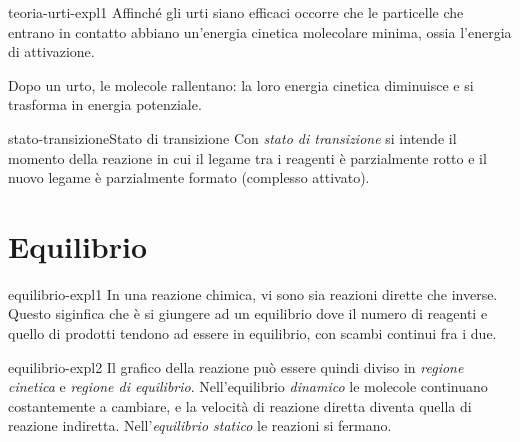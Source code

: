 \documentclass[preview]{standalone}
\begin{document}

\begin{snippet}{teoria-urti-expl1}
    Affinché gli urti siano efficaci occorre che le particelle che
    entrano in contatto abbiano un'energia cinetica molecolare
    minima, ossia l'energia di attivazione.

    Dopo un urto, le molecole rallentano: la loro energia
    cinetica diminuisce e si trasforma in energia potenziale.
\end{snippet}

\begin{snippetdefinition}{stato-transizione}{Stato di transizione}
    Con \textit{stato di transizione} si intende
    il momento della reazione in cui il
    legame tra i reagenti è parzialmente rotto e il nuovo
    legame è parzialmente formato (complesso attivato).
\end{snippetdefinition}



\section{Equilibrio}

\begin{snippet}{equilibrio-expl1}
    In una reazione chimica, vi sono sia reazioni dirette che inverse.
    Questo siginfica che è si giungere ad un equilibrio dove
    il numero di reagenti e quello di prodotti tendono ad essere in equilibrio,
    con scambi continui fra i due.
\end{snippet}


\begin{snippet}{equilibrio-expl2}
    Il grafico della reazione può essere quindi diviso in \textit{regione cinetica}
    e \textit{regione di equilibrio}. 
    Nell'equilibrio \textit{dinamico} le molecole continuano costantemente a
    cambiare, e la velocità di reazione diretta diventa quella di reazione indiretta.
    Nell'\textit{equilibrio statico} le reazioni si fermano.
\end{snippet}

\end{document}
